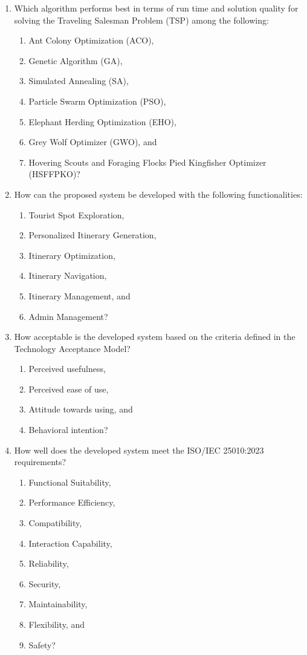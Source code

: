 \begin{enumerate}
    \item Which algorithm performs best in terms of run time and solution quality for solving the Traveling Salesman Problem (TSP) among the following:
    \begin{enumerate} [label*=\arabic*.]
        \item Ant Colony Optimization (ACO),
        \item Genetic Algorithm (GA),
        \item Simulated Annealing (SA),
        \item Particle Swarm Optimization (PSO),
        \item Elephant Herding Optimization (EHO),
        \item Grey Wolf Optimizer (GWO), and
        \item Hovering Scouts and Foraging Flocks Pied Kingfisher Optimizer (HSFFPKO)?
    \end{enumerate}
    \item How can the proposed system be developed with the following functionalities:
    \begin{enumerate} [label*=\arabic*.]
        \item  Tourist Spot Exploration,
        \item  Personalized Itinerary Generation,
        \item  Itinerary Optimization,
        \item  Itinerary Navigation,
        \item  Itinerary Management, and
        \item  Admin Management?
    \end{enumerate}
    \item How acceptable is the developed system based on the criteria defined in the Technology Acceptance Model?
    \begin{enumerate} [label*=\arabic*.]
        \item Perceived usefulness,
        \item Perceived ease of use,
        \item Attitude towards using, and
        \item Behavioral intention?
    \end{enumerate}
    \item How well does the developed system meet the ISO/IEC 25010:2023 requirements?
    \begin{enumerate} [label*=\arabic*.]
        \item Functional Suitability,
        \item Performance Efficiency,
        \item Compatibility,
        \item Interaction Capability,
        \item Reliability,
        \item Security,
        \item Maintainability,
        \item Flexibility, and
        \item Safety?
    \end{enumerate}
\end{enumerate}

